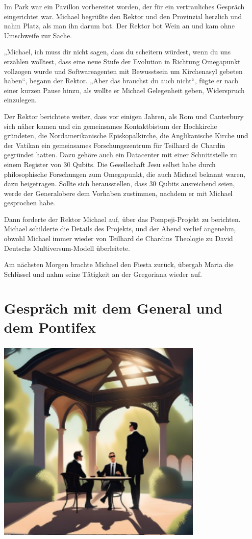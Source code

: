 \documentclass[
]{article}
\begin{document}
Im Park war ein Pavillon vorbereitet worden, der für ein vertrauliches
Gespräch eingerichtet war. Michael begrüßte den Rektor und den
Provinzial herzlich und nahm Platz, als man ihn darum bat. Der Rektor
bot Wein an und kam ohne Umschweife zur Sache.

„Michael, ich muss dir nicht sagen, dass du scheitern würdest, wenn du
uns erzählen wolltest, dass eine neue Stufe der Evolution in Richtung
Omegapunkt vollzogen wurde und Softwareagenten mit Bewusstsein um
Kirchenasyl gebeten haben``, begann der Rektor. „Aber das brauchst du
auch nicht``, fügte er nach einer kurzen Pause hinzu, als wollte er
Michael Gelegenheit geben, Widerspruch einzulegen.

Der Rektor berichtete weiter, dass vor einigen Jahren, als Rom und
Canterbury sich näher kamen und ein gemeinsames Kontaktbistum der
Hochkirche gründeten, die Nordamerikanische Episkopalkirche, die
Anglikanische Kirche und der Vatikan ein gemeinsames Forschungszentrum
für Teilhard de Chardin gegründet hatten. Dazu gehöre auch ein
Datacenter mit einer Schnittstelle zu einem Register von 30 Qubits. Die
Gesellschaft Jesu selbst habe durch philosophische Forschungen zum
Omegapunkt, die auch Michael bekannt waren, dazu beigetragen. Sollte
sich herausstellen, dass 30 Qubits ausreichend seien, werde der
Generalobere dem Vorhaben zustimmen, nachdem er mit Michael gesprochen
habe.

Dann forderte der Rektor Michael auf, über das Pompeji-Projekt zu
berichten. Michael schilderte die Details des Projekts, und der Abend
verlief angenehm, obwohl Michael immer wieder von Teilhard de Chardins
Theologie zu David Deutschs Multiversum-Modell überleitete.

Am nächsten Morgen brachte Michael den Fiesta zurück, übergab Maria die
Schlüssel und nahm seine Tätigkeit an der Gregoriana wieder auf.

\section{Gespräch mit dem General und dem
Pontifex}\label{gespruxe4ch-mit-dem-general-und-dem-pontifex}

\includegraphics[width=4.02239in,height=4.06863in]{media/image4.png}
\end{document}
